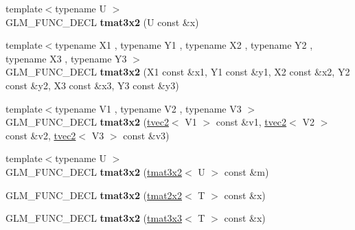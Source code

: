 \begin{DoxyCompactItemize}
\item 
\hypertarget{structglm_1_1detail_1_1tmat3x2_a3dfc353701bc710b38ad9d1d2a3b3c33}{{\footnotesize template$<$typename U $>$ }\\G\-L\-M\-\_\-\-F\-U\-N\-C\-\_\-\-D\-E\-C\-L {\bfseries tmat3x2} (U const \&x)}\label{structglm_1_1detail_1_1tmat3x2_a3dfc353701bc710b38ad9d1d2a3b3c33}

\item 
\hypertarget{structglm_1_1detail_1_1tmat3x2_a79b47962349e29fa8ecb2b001210818a}{{\footnotesize template$<$typename X1 , typename Y1 , typename X2 , typename Y2 , typename X3 , typename Y3 $>$ }\\G\-L\-M\-\_\-\-F\-U\-N\-C\-\_\-\-D\-E\-C\-L {\bfseries tmat3x2} (X1 const \&x1, Y1 const \&y1, X2 const \&x2, Y2 const \&y2, X3 const \&x3, Y3 const \&y3)}\label{structglm_1_1detail_1_1tmat3x2_a79b47962349e29fa8ecb2b001210818a}

\item 
\hypertarget{structglm_1_1detail_1_1tmat3x2_aef9cee068c06d4f17b179a0ed547e9bd}{{\footnotesize template$<$typename V1 , typename V2 , typename V3 $>$ }\\G\-L\-M\-\_\-\-F\-U\-N\-C\-\_\-\-D\-E\-C\-L {\bfseries tmat3x2} (\hyperlink{structglm_1_1detail_1_1tvec2}{tvec2}$<$ V1 $>$ const \&v1, \hyperlink{structglm_1_1detail_1_1tvec2}{tvec2}$<$ V2 $>$ const \&v2, \hyperlink{structglm_1_1detail_1_1tvec2}{tvec2}$<$ V3 $>$ const \&v3)}\label{structglm_1_1detail_1_1tmat3x2_aef9cee068c06d4f17b179a0ed547e9bd}

\item 
\hypertarget{structglm_1_1detail_1_1tmat3x2_a96ddf6c4f4c4c04e26cfdaabd98c3b83}{{\footnotesize template$<$typename U $>$ }\\G\-L\-M\-\_\-\-F\-U\-N\-C\-\_\-\-D\-E\-C\-L {\bfseries tmat3x2} (\hyperlink{structglm_1_1detail_1_1tmat3x2}{tmat3x2}$<$ U $>$ const \&m)}\label{structglm_1_1detail_1_1tmat3x2_a96ddf6c4f4c4c04e26cfdaabd98c3b83}

\item 
\hypertarget{structglm_1_1detail_1_1tmat3x2_a6a485c50629df672e139304600acfa98}{G\-L\-M\-\_\-\-F\-U\-N\-C\-\_\-\-D\-E\-C\-L {\bfseries tmat3x2} (\hyperlink{structglm_1_1detail_1_1tmat2x2}{tmat2x2}$<$ T $>$ const \&x)}\label{structglm_1_1detail_1_1tmat3x2_a6a485c50629df672e139304600acfa98}

\item 
\hypertarget{structglm_1_1detail_1_1tmat3x2_aa11eb83ebd8b806596808d8fa628022c}{G\-L\-M\-\_\-\-F\-U\-N\-C\-\_\-\-D\-E\-C\-L {\bfseries tmat3x2} (\hyperlink{structglm_1_1detail_1_1tmat3x3}{tmat3x3}$<$ T $>$ const \&x)}\label{structglm_1_1detail_1_1tmat3x2_aa11eb83ebd8b806596808d8fa628022c}


\end{DoxyCompactItemize}
